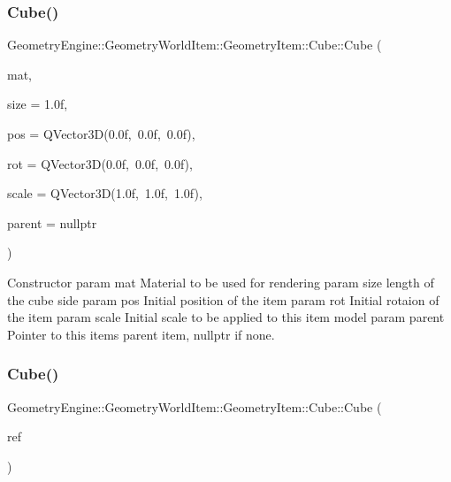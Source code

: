 \subsubsection{\texorpdfstring{Cube()}{Cube()}\hspace{0.1cm}{\footnotesize\ttfamily [1/2]}}
{\footnotesize\ttfamily Geometry\+Engine\+::\+Geometry\+World\+Item\+::\+Geometry\+Item\+::\+Cube\+::\+Cube (\begin{DoxyParamCaption}\item[{const \mbox{\hyperlink{class_geometry_engine_1_1_geometry_material_1_1_material}{Geometry\+Material\+::\+Material}} \&}]{mat,  }\item[{float}]{size = {\ttfamily 1.0f},  }\item[{const Q\+Vector3D \&}]{pos = {\ttfamily QVector3D(0.0f,~0.0f,~0.0f)},  }\item[{const Q\+Vector3D \&}]{rot = {\ttfamily QVector3D(0.0f,~0.0f,~0.0f)},  }\item[{const Q\+Vector3D \&}]{scale = {\ttfamily QVector3D(1.0f,~1.0f,~1.0f)},  }\item[{\mbox{\hyperlink{class_geometry_engine_1_1_geometry_world_item_1_1_world_item}{World\+Item}} $\ast$}]{parent = {\ttfamily nullptr} }\end{DoxyParamCaption})}

Constructor param mat Material to be used for rendering param size length of the cube side param pos Initial position of the item param rot Initial rotaion of the item param scale Initial scale to be applied to this item model param parent Pointer to this items parent item, nullptr if none. \mbox{\label{class_geometry_engine_1_1_geometry_world_item_1_1_geometry_item_1_1_cube_a159c3e7e79d19df2a9857fc6b77d5955}} 
\subsubsection{\texorpdfstring{Cube()}{Cube()}\hspace{0.1cm}{\footnotesize\ttfamily [2/2]}}
{\footnotesize\ttfamily Geometry\+Engine\+::\+Geometry\+World\+Item\+::\+Geometry\+Item\+::\+Cube\+::\+Cube (\begin{DoxyParamCaption}\item[{const \mbox{\hyperlink{class_geometry_engine_1_1_geometry_world_item_1_1_geometry_item_1_1_cube}{Cube}} \&}]{ref }\end{DoxyParamCaption})}

